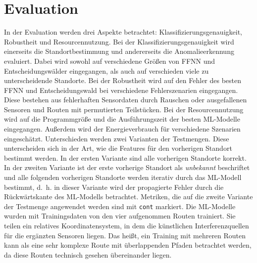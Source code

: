 \chapter{Evaluation}
In der Evaluation werden drei Aspekte betrachtet: Klassifizierungsgenauigkeit, Robustheit und Resourcennutzung.
Bei der Klassifizierungsgenauigkeit wird einerseits die Standortbestimmung und andererseits die Anomalieerkennung evaluiert.
Dabei wird sowohl auf verschiedene Größen von FFNN und Entscheidungswälder eingegangen,
als auch auf verschieden viele zu unterscheidende Standorte.
\newline
\newline
Bei der Robustheit wird auf den Fehler des besten FFNN und Entscheidungswald bei verschiedene Fehlerszenarien eingegangen.
Diese bestehen aus fehlerhaften Sensordaten durch Rauschen oder ausgefallenen Sensoren und Routen mit permutierten Teilstücken.
\newline
\newline
Bei der Resourcennutzung wird auf die Programmgröße und die Ausführungszeit der besten ML-Modelle eingegangen.
Außerdem wird der Energieverbrauch für verschiedene Szenarien eingeschätzt.
\newline
\newline
Unterschieden werden zwei Varianten der Testmengen.
Diese unterscheiden sich in der Art, wie die Features für den vorherigen Standort bestimmt werden.
In der ersten Variante sind alle vorherigen Standorte korrekt.
In der zweiten Variante ist der erste vorherige Standort als \textit{unbekannt} beschriftet und alle folgenden vorherigen Standorte werden iterativ durch das ML-Modell bestimmt,
d.~h. in dieser Variante wird der propagierte Fehler durch die Rückwärtskante des ML-Modells betrachtet.
Metriken, die auf die zweite Variante der Testmenge angewendet werden sind mit \texttt{cont} markiert.
\newline
\newline
Die ML-Modelle wurden mit Trainingsdaten von den vier aufgenommen Routen trainiert.
Sie teilen ein relatives Koordinatensystem, in dem die künstlichen Interferenzquellen für die ergänzten Sensoren liegen.
Das heißt, ein Training mit mehreren Routen kann als eine sehr komplexe Route mit überlappenden Pfaden betrachtet werden,
da diese Routen technisch gesehen übereinander liegen.










